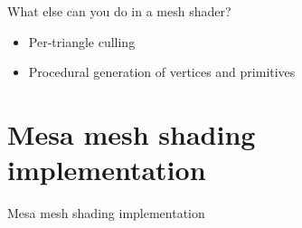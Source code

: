 \documentclass[aspectratio=169,t,xcolor=table]{beamer}
\begin{document}
\begin{frame}{What else can you do in a mesh shader?}

    \LARGE

    \begin{itemize}
      	\item Per-triangle culling
      	\item Procedural generation of vertices and primitives
    \end{itemize}

\end{frame}

\section{Mesa mesh shading implementation}

{
\begin{frame}{Mesa mesh shading implementation}
\end{frame}
}
\end{document}
